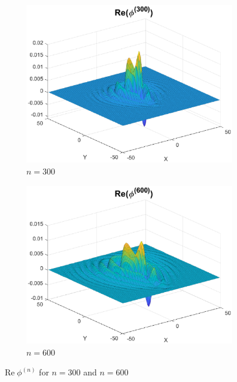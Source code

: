 \documentclass[smallextended]{svjour3}
\theoremstyle{remark}
\renewcommand\Re{\operatorname{Re}}%
\begin{document}
\begin{example}
\begin{figure}[!htb]
    \begin{subfigure}{0.49\textwidth}
    \centering
    \includegraphics[scale=0.4]{Fig8a.eps}
    \caption{$n=300$}
    \end{subfigure}
    \begin{subfigure}{0.49\textwidth}
    \centering
    \includegraphics[scale=0.4]{Fig8b.eps}
    \caption{$n = 600$}
    \label{fig:Conv_Pwr_2b}
    \end{subfigure}
    \caption{$\Re{\phi^{(n)}}$ for $n = 300$ and $n=600$}
    \label{fig:Conv_Pwr_20}
\end{figure}
\end{example}
\end{document}
